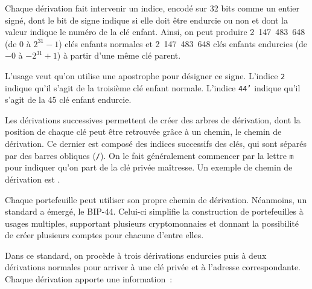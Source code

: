 Chaque dérivation fait intervenir un indice, encodé sur 32 bits comme un entier signé, dont le bit de signe indique si elle doit être endurcie ou non et dont la valeur indique le numéro de la clé enfant. Ainsi, on peut produire 2~147~483~648 (de $0$ à $2^{31} - 1$) clés enfants normales et 2~147~483~648 clés enfants endurcies (de $-0$ à $- 2^{31} + 1$) à partir d'une même clé parent.

L'usage veut qu'on utilise une apostrophe pour désigner ce signe. L'indice \texttt{2} indique qu'il s'agit de la troisième clé enfant normale. L'indice \texttt{44'} indique qu'il s'agit de la 45\ieme{} clé enfant endurcie.


Les dérivations successives permettent de créer des arbres de dérivation, dont la position de chaque clé peut être retrouvée grâce à un chemin, le chemin de dérivation. Ce dernier est composé des indices successifs des clés, qui sont séparés par des barres obliques (\texttt{/}). On le fait généralement commencer par la lettre \texttt{m} pour indiquer qu'on part de la clé privée maîtresse. Un exemple de chemin de dérivation est .

Chaque portefeuille peut utiliser son propre chemin de dérivation. Néanmoins, un standard a émergé, le BIP-44. Celui-ci simplifie la construction de portefeuilles à usages multiples, supportant plusieurs cryptomonnaies et donnant la possibilité de créer plusieurs comptes pour chacune d'entre elles.

Dans ce standard, on procède à trois dérivations endurcies puis à deux dérivations normales pour arriver à une clé privée et à l'adresse correspondante. Chaque dérivation apporte une information~:


